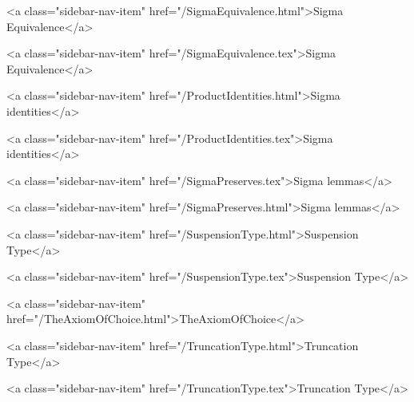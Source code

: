       
    
      
        
          <a class="sidebar-nav-item" href="/SigmaEquivalence.html">Sigma Equivalence</a>
        
      
    
      
        
          <a class="sidebar-nav-item" href="/SigmaEquivalence.tex">Sigma Equivalence</a>
        
      
    
      
        
          <a class="sidebar-nav-item" href="/ProductIdentities.html">Sigma identities</a>
        
      
    
      
        
          <a class="sidebar-nav-item" href="/ProductIdentities.tex">Sigma identities</a>
        
      
    
      
        
          <a class="sidebar-nav-item" href="/SigmaPreserves.tex">Sigma lemmas</a>
        
      
    
      
        
          <a class="sidebar-nav-item" href="/SigmaPreserves.html">Sigma lemmas</a>
        
      
    
      
        
          <a class="sidebar-nav-item" href="/SuspensionType.html">Suspension Type</a>
        
      
    
      
        
          <a class="sidebar-nav-item" href="/SuspensionType.tex">Suspension Type</a>
        
      
    
      
        
          <a class="sidebar-nav-item" href="/TheAxiomOfChoice.html">TheAxiomOfChoice</a>
        
      
    
      
        
          <a class="sidebar-nav-item" href="/TruncationType.html">Truncation Type</a>
        
      
    
      
        
          <a class="sidebar-nav-item" href="/TruncationType.tex">Truncation Type</a>
        
